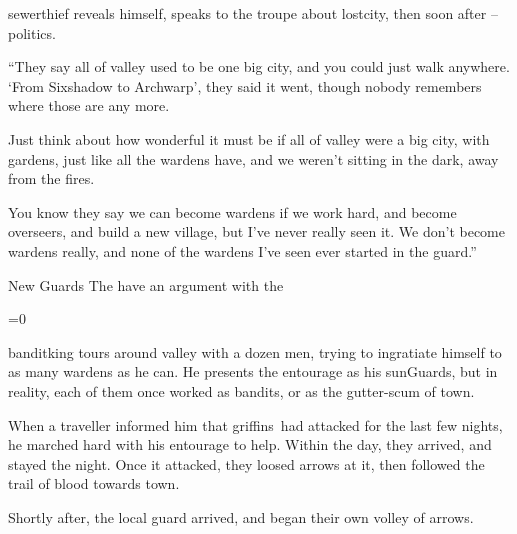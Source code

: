 
\Gls{sewerthief} reveals himself, speaks to the troupe about \gls{lostcity}, then soon after -- politics.

\begin{speechtext}
  ``They say all of \gls{valley} used to be one big city, and you could just walk anywhere.
  `From Sixshadow to Archwarp', they said it went, though nobody remembers where those are any more.

  Just think about how wonderful it must be if all of \gls{valley} were a big city, with gardens, just like all the \glspl{warden} have, and we weren't sitting in the dark, away from the fires.

  You know they say we can become \glspl{warden} if we work hard, and become overseers, and build a new \gls{village}, but I've never really seen it.
  We don't become \glspl{warden} really, and none of the \glspl{warden} I've seen ever started in the \gls{guard}.''
\end{speechtext}


{New Guards}%
{The  have an argument with the }%

\ifnum\value{temperature}=0
  \newcommand\localMonster{griffins}
\else
  \newcommand\localMonster{\pgls{basilisk}}
\fi

\begin{exampletext}
  \Gls{banditking} tours around \gls{valley} with a dozen men, trying to ingratiate himself to as many \glspl{warden} as he can.
  He presents the entourage as his \glspl{sunGuard}, but in reality, each of them once worked as bandits, or as the gutter-scum of \gls{town}.

  When a traveller informed him that \localMonster\ had attacked  for the last few nights, he marched hard with his entourage to help.
  Within the day, they arrived, and stayed the night.
  Once it attacked, they loosed arrows at it, then followed the trail of blood towards \gls{town}.

  Shortly after, the local \gls{guard} arrived, and began their own volley of arrows.
\end{exampletext}

